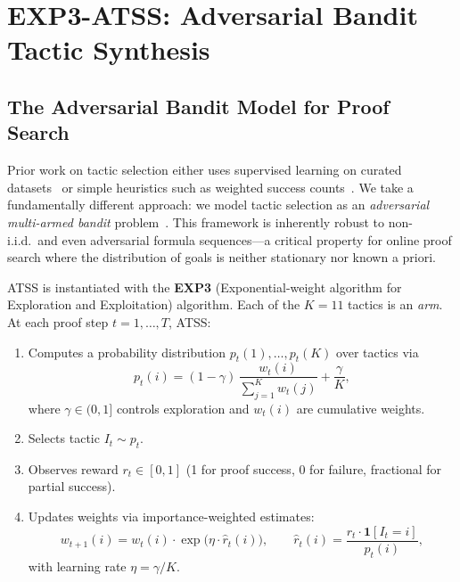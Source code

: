 \documentclass[conference]{IEEEtran}
\newcommand{\ATSS}{\textsc{ATSS}}
\begin{document}
\section{EXP3-ATSS: Adversarial Bandit Tactic Synthesis}
\label{sec:atss}

\subsection{The Adversarial Bandit Model for Proof Search}

Prior work on tactic selection either uses supervised learning on
curated datasets~\cite{DeepSeekProver2024,SongYangAnandkumar2024} or
simple heuristics such as weighted success
counts~\cite{SekiyamaSuenaga2018}.  We take a fundamentally different
approach: we model tactic selection as an \emph{adversarial multi-armed
bandit} problem~\cite{AuerCesaBianchiFreundSchapire2002}. This
framework is inherently robust to non-i.i.d.\ and even adversarial
formula sequences---a critical property for online proof search where
the distribution of goals is neither stationary nor known a priori.

\ATSS{} is instantiated with the \textbf{EXP3} (Exponential-weight
algorithm for Exploration and Exploitation) algorithm.
Each of the $K = 11$ tactics is an \emph{arm}. At each proof step
$t=1,\dots,T$, \ATSS{}:
\begin{enumerate}
  \item Computes a probability distribution
    $p_t(1),\dots,p_t(K)$ over tactics via
    \begin{equation}
      p_t(i) = (1-\gamma)\,\frac{w_t(i)}{\sum_{j=1}^{K}w_t(j)} + \frac{\gamma}{K},
      \label{eq:exp3-dist}
    \end{equation}
    where $\gamma \in (0,1]$ controls exploration and $w_t(i)$ are
    cumulative weights.
  \item Selects tactic $I_t \sim p_t$.
  \item Observes reward $r_t \in [0,1]$ (1 for proof success, 0 for
    failure, fractional for partial success).
  \item Updates weights via importance-weighted estimates:
    \begin{equation}
      w_{t+1}(i) = w_t(i) \cdot \exp\!\bigl(\eta \cdot \hat{r}_t(i)\bigr),
      \qquad
      \hat{r}_t(i) = \frac{r_t \cdot \mathbf{1}[I_t=i]}{p_t(i)},
      \label{eq:exp3-update}
    \end{equation}
    with learning rate $\eta = \gamma/K$.
\end{enumerate}
\end{document}
